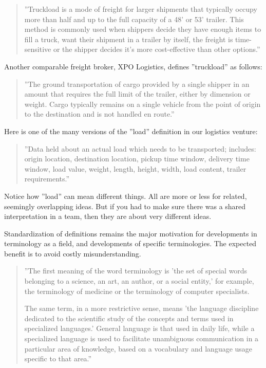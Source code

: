 \documentclass[graybox,envcountchap,sectrefs]{svmono}
\begin{document}
\begin{quote}
    ''Truckload is a mode of freight for larger shipments that typically occupy more than half and up to the full capacity of a 48’ or 53’ trailer. This method is commonly used when shippers decide they have enough items to fill a truck, want their shipment in a trailer by itself, the freight is time-sensitive or the shipper decides it’s more cost-effective than other options.''
\end{quote}
Another comparable freight broker, XPO Logistics, defines ''truckload'' as follows:
\begin{quote}
    ''The ground transportation of cargo provided by a single shipper in an amount that requires the full limit of the trailer, either by dimension or weight. Cargo typically remains on a single vehicle from the point of origin to the destination and is not handled en route.''
\end{quote}
Here is one of the many versions of the ''load'' definition in our logistics venture:
\begin{quote}
    ''Data held about an actual load which needs to be transported; includes: origin location, destination location, pickup time window, delivery time window, load value, weight, length, height, width, load content, trailer requirements.''
\end{quote}
Notice how ''load'' can mean different things. All are more or less for related, seemingly overlapping ideas. But if you had to make sure there was a shared interpretation in a team, then they are about very different ideas.

Standardization of definitions remains the major motivation for developments in terminology as a field, and developments of specific terminologies. The expected benefit is to avoid costly misunderstanding.



\begin{quote}
''The first meaning of the word terminology is 'the set of special
words belonging to a science, an art, an author, or a social entity,'
for example, the terminology of medicine or the terminology of
computer specialists.
 
The same term, in a more restrictive sense, means 'the language
discipline dedicated to the scientific study of the concepts and terms
used in specialized languages.' General language is that used in
daily life, while a specialized language is used to facilitate
unambiguous communication in a particular area of knowledge,
based on a vocabulary and language usage specific to that area.'' \cite{pavel2001precis}
\end{quote}
\end{document}
